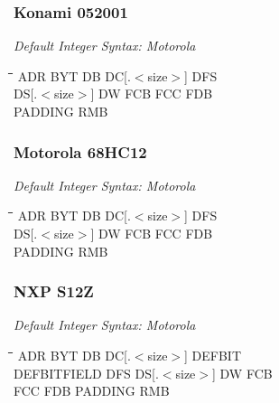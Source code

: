 \subsubsection{Konami 052001}

{\em Default Integer Syntax: Motorola}

{\tt\begin{tabbing}
\hspace{3cm}\=\hspace{3cm}\=\hspace{3cm}\=\hspace{3cm}\=\kill
ADR        \> BYT         \> DB          \> DC[.$<$size$>$] DFS \\
DS[.$<$size$>$] \> DW      \> FCB         \> FCC \> FDB        \\
PADDING    \> RMB \\
\end{tabbing}}

\subsubsection{Motorola 68HC12}

{\em Default Integer Syntax: Motorola}

{\tt\begin{tabbing}
\hspace{3cm}\=\hspace{3cm}\=\hspace{3cm}\=\hspace{3cm}\=\kill
ADR        \> BYT         \> DB          \> DC[.$<$size$>$] \> DFS     \\
DS[.$<$size$>$] DW        \> FCB         \> FCC         \> FDB \\
PADDING     \> RMB \\
\end{tabbing}}

\subsubsection{NXP S12Z}

{\em Default Integer Syntax: Motorola}

{\tt\begin{tabbing}
\hspace{3cm}\=\hspace{3cm}\=\hspace{3cm}\=\hspace{3cm}\=\kill
ADR        \> BYT         \> DB          \> DC[.$<$size$>$] \> DEFBIT \\
DEFBITFIELD \> DFS        \> DS[.$<$size$>$] \> DW          \> FCB \\
FCC     \> FDB \> PADDING \> RMB \\
\end{tabbing}}

